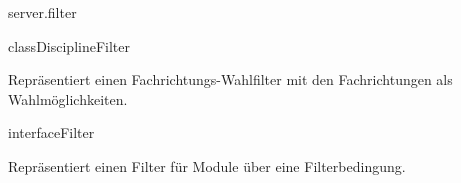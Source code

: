 \begin{texdocpackage}{server.filter}
\begin{texdocclass}{class}{DisciplineFilter}
\label{texdoclet:edu.kit.informatik.studyplan.server.filter.DisciplineFilter}
\begin{texdocclassintro}
Repräsentiert einen Fachrichtungs-Wahlfilter mit den Fachrichtungen als Wahlmöglichkeiten.\end{texdocclassintro}
\begin{texdocclassconstructors}
\end{texdocclassconstructors}
\begin{texdocclassmethods}
\end{texdocclassmethods}
\end{texdocclass}


\begin{texdocclass}{interface}{Filter}
\label{texdoclet:edu.kit.informatik.studyplan.server.filter.Filter}
\begin{texdocclassintro}
Repräsentiert einen Filter für Module über eine Filterbedingung.\end{texdocclassintro}
\begin{texdocclassmethods}
\end{texdocclassmethods}
\end{texdocclass}



\end{texdocpackage}
